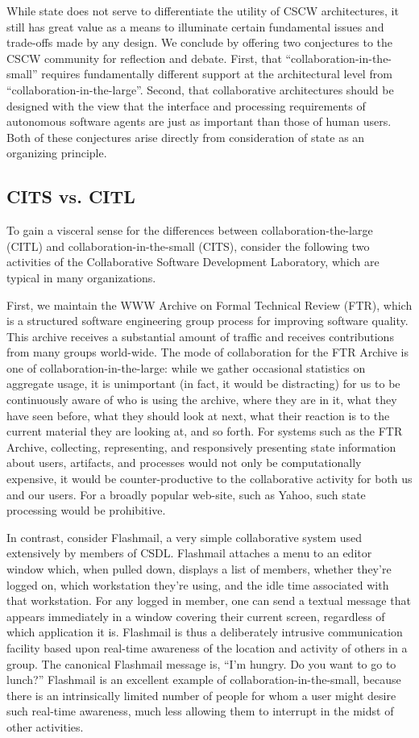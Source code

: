 While state does not serve to differentiate the utility of CSCW
architectures, it still has great value as a means to illuminate certain
fundamental issues and trade-offs made by any design.  We conclude by
offering two conjectures to the CSCW community for reflection and debate.
First, that ``collaboration-in-the-small'' requires fundamentally different
support at the architectural level from ``collaboration-in-the-large''.
Second, that collaborative architectures should be designed with the view
that the interface and processing requirements of autonomous software
agents are just as important than those of human users. Both of these
conjectures arise directly from consideration of state as an organizing
principle.

\subsection{CITS vs. CITL}

To gain a visceral sense for the differences between
collaboration-the-large (CITL) and collaboration-in-the-small (CITS),
consider the following two activities of the Collaborative Software
Development Laboratory, which are typical in many organizations.  

First, we maintain the WWW Archive on Formal Technical Review (FTR), which
is a structured software engineering group process for improving software
quality.  This archive receives a substantial amount of traffic and
receives contributions from many groups world-wide.  The mode of
collaboration for the FTR Archive is one of collaboration-in-the-large:
while we gather occasional statistics on aggregate usage, it is unimportant
(in fact, it would be distracting) for us to be continuously aware of who
is using the archive, where they are in it, what they have seen before,
what they should look at next, what their reaction is to the current
material they are looking at, and so forth.  For systems such as the FTR
Archive, collecting, representing, and responsively presenting state
information about users, artifacts, and processes would not only be
computationally expensive, it would be counter-productive to the
collaborative activity for both us and our users.  For a broadly popular
web-site, such as Yahoo, such state processing would be prohibitive.

In contrast, consider Flashmail, a very simple collaborative system used
extensively by members of CSDL. Flashmail attaches a menu to an editor
window which, when pulled down, displays a list of members, whether they're
logged on, which workstation they're using, and the idle time associated
with that workstation. For any logged in member, one can send a textual
message that appears immediately in a window covering their current screen,
regardless of which application it is. Flashmail is thus a deliberately
intrusive communication facility based upon real-time awareness of the
location and activity of others in a group. The canonical Flashmail message
is, ``I'm hungry. Do you want to go to lunch?''  Flashmail is an excellent
example of collaboration-in-the-small, because there is an intrinsically
limited number of people for whom a user might desire such real-time
awareness, much less allowing them to interrupt in the midst of other
activities. 


